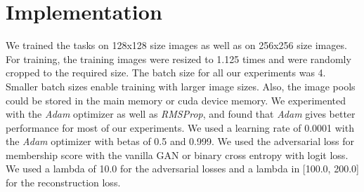 \documentclass[a4paper,twoside]{article}
\begin{document}
\section{Implementation}
\label{Implementation}
\noindent
We trained the tasks on 128x128 size images as well as on 256x256 size images. For training, the training images were resized to 1.125 times and were randomly cropped to the required size. The batch size for all our experiments was 4. Smaller batch sizes enable training with larger image sizes. Also, the image pools could be stored in the main memory or cuda device memory. We experimented with the \textit{Adam} optimizer as well as \textit{RMSProp}, and found that \textit{Adam} gives better performance for most of our experiments. We used a learning rate of 0.0001 with the \textit{Adam} optimizer with betas of 0.5 and 0.999. We used the adversarial loss for membership score with the vanilla GAN or binary cross entropy with logit loss. We used a lambda of 10.0 for the adversarial losses and a lambda in [100.0, 200.0] for the reconstruction loss. 
\end{document}
